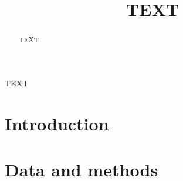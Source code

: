 \documentclass[amt, manuscript]{copernicus}
\begin{document}
\title{TEXT}



\Author[]{}{}
\Author[]{}{}
\Author[]{}{}












\maketitle



\begin{abstract}
TEXT
\end{abstract}




\introduction  %
TEXT
\section{Introduction}

\section{Data and methods}
\end{document}
